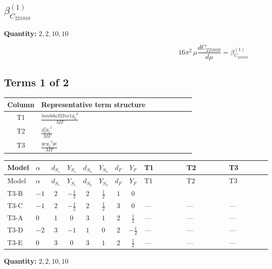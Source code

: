 \documentclass[8pt]{article}
\begin{document}
\begin{landscape}
\section*{$\beta_{C_{221010}}^{(1)}$}
\noindent\textbf{Quantity: }$\mathrm{2,2,10,10}$\par\smallskip
\[16\pi^2\,\mu\frac{d C_{221010}}{d\mu}=\beta_{C_{221010}}^{(1)}\]
\subsection*{Terms 1 of 2}
\begin{center}
\begin{tabular}{@{}c >{\raggedright\arraybackslash}p{0.82\linewidth}@{}}
\toprule
Column & Representative term structure \\
\midrule
T1 & \(\displaystyle \frac{lambdaS2Inv1 \overline{y_{2}}^{2}}{MF}\) \\
\midrule
T2 & \(\displaystyle \frac{g_{2}^{2} \overline{y_{2}}^{2}}{MF}\) \\
\midrule
T3 & \(\displaystyle \frac{ye \overline{y_{2}}^{2} \overline{ye}}{MF}\) \\
\midrule
\bottomrule
\end{tabular}
\end{center}
\smallskip
\tiny
\begin{longtable}{@{}llcccccc >{\raggedright\arraybackslash}p{0.21\linewidth} >{\raggedright\arraybackslash}p{0.21\linewidth} >{\raggedright\arraybackslash}p{0.21\linewidth}@{}}
\toprule
Model & $\alpha$ & $d_{S_1}$ & $Y_{S_1}$ & $d_{S_2}$ & $Y_{S_2}$ & $d_F$ & $Y_F$ & T1 & T2 & T3 \\
\midrule
\endfirsthead
\toprule
Model & $\alpha$ & $d_{S_1}$ & $Y_{S_1}$ & $d_{S_2}$ & $Y_{S_2}$ & $d_F$ & $Y_F$ & T1 & T2 & T3 \\
\midrule
\endhead
T3-B & $-1$ & $2$ & $-\frac{1}{2}$ & $2$ & $\frac{1}{2}$ & $1$ & $0$ & \scriptsize\adjustbox{max width=\linewidth}{$\begin{gathered} \frac{lambdaS2Inv1 \overline{y_{2}}^{2}}{2 MF}\end{gathered}$} & \scriptsize\adjustbox{max width=\linewidth}{$\begin{gathered} \frac{3 g_{2}^{2} \overline{y_{2}}^{2}}{4 MF}\end{gathered}$} & \scriptsize\adjustbox{max width=\linewidth}{$\begin{gathered} - \frac{ye \overline{y_{2}}^{2} \overline{ye}}{4 MF}\end{gathered}$} \\
\midrule
T3-C & $-1$ & $2$ & $-\frac{1}{2}$ & $2$ & $\frac{1}{2}$ & $3$ & $0$ & --- & --- & --- \\
\midrule
T3-A & $0$ & $1$ & $0$ & $3$ & $1$ & $2$ & $\frac{1}{2}$ & --- & --- & --- \\
\midrule
T3-D & $-2$ & $3$ & $-1$ & $1$ & $0$ & $2$ & $-\frac{1}{2}$ & --- & --- & --- \\
\midrule
T3-E & $0$ & $3$ & $0$ & $3$ & $1$ & $2$ & $\frac{1}{2}$ & --- & --- & --- \\
\midrule
\bottomrule
\end{longtable}
\clearpage
\noindent\textbf{Quantity: }$\mathrm{2,2,10,10}$\par\smallskip

\end{landscape}
\end{document}
